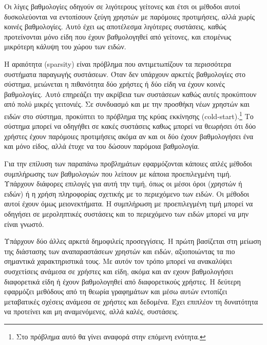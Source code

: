 Οι λίγες βαθμολογίες οδηγούν σε λιγότερους γείτονες και έτσι οι μέθοδοι αυτοί δυσκολεύονται να εντοπίσουν ζεύγη χρηστών με παρόμοιες προτιμήσεις, αλλά χωρίς κοινές βαθμολογίες. Αυτό έχει ως αποτέλεσμα λιγότερες συστάσεις, καθώς προτείνονται μόνο είδη που έχουν βαθμολογηθεί από γείτονες, και επομένως μικρότερη κάλυψη του χώρου των ειδών. \par
Η αραιότητα ({\en sparsity}) είναι πρόβλημα που αντιμετωπίζουν τα περισσότερα συστήματα παραγωγής συστάσεων. Όταν δεν υπάρχουν αρκετές βαθμολογίες στο σύστημα, μειώνεται η πιθανότητα δύο χρήστες ή δύο είδη να έχουν κοινές βαθμολογίες. Αυτό επηρεάζει την ακρίβεια των συστάσεων καθώς αυτές προκύπτουν από πολύ μικρές γειτονιές. Σε συνδυασμό και με την προσθήκη νέων χρηστών και ειδών στο σύστημα, προκύπτει το πρόβλημα της κρύας εκκίνησης ({\en cold-start}).\footnote{Στο πρόβλημα αυτό θα γίνει αναφορά στην επόμενη ενότητα.} Το σύστημα μπορεί να οδηγήθει σε κακές συστάσεις καθως μπορεί να θεωρήσει ότι δύο χρήστες έχουν παρόμοιες προτιμήσεις ακόμα αν και οι δύο έχουν βαθμολογήσει ένα και μόνο είδος, αλλά έτυχε να του δώσουν παρόμοια βαθμολογία. \par
Για την επίλυση των παραπάνω προβλημάτων εφαρμόζονται κάποιες απλές μέθοδοι συμπλήρωσης των βαθμολογιών που λείπουν με κάποια προεπιλεγμένη τιμή. Υπάρχουν διάφορες επιλογές για αυτή την τιμή, όπως οι μέσοι όροι (χρηστών ή ειδών) ή η χρήση πληροφορίας σχετικής με το περιεχόμενο των ειδών. Οι μέθοδοι αυτοί έχουν όμως μειονεκτήματα. Η συμπλήρωση με προεπιλεγμένη τιμή μπορεί να οδηγήσει σε μεροληπτικές συστάσεις και το περιεχόμενο των ειδών μπορεί να μην είναι γνωστό.\par Υπάρχουν δύο άλλες αρκετά δημοφιλείς προσεγγίσεις. Η πρώτη βασίζεται στη μείωση της διάστασης των αναπαραστάσεων χρηστών και ειδών, αξιοποιώντας τα πιο σημαντικά χαρακτηριστικά τους. Με αυτόν τον τρόπο μπορεί να ανακαλύψει συσχετίσεις ανάμεσα σε χρήστες και είδη, ακόμα και αν εχουν βαθμολογήσει διαφορετικά είδη ή έχουν βαθμολογηθεί από διαφορετικούς χρήστες. Η δεύτερη εφαρμόζει μεθόδους από τη θεωρία γραφημάτων και μέσω αυτών εντοπίζει μεταβατικές σχέσεις ανάμεσα σε χρήστες και δεδομένα. Έχει επιπλέον τη δυνατότητα να προτείνει και μη αναμενόμενες, αλλά καλές, συστάσεις.
